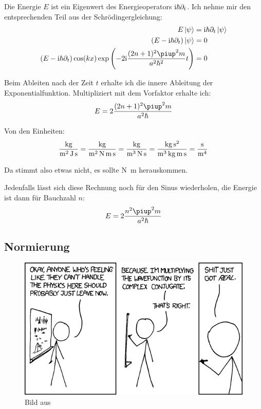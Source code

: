 Die Energie $E$ ist ein Eigenwert des Energieoperators $\mathrm i \hbar \partial_t$.
Ich nehme mir den entsprechenden Teil aus der Schrödingergleichung:
\begin{align*}
	E \ket\psi &= \iup \hbar \partial_t \ket\psi \\
	\del{E - \ii \hbar \partial_t} \ket\psi &= 0 \\
	\del{E - \ii \hbar \partial_t} \cos(kx) \exp\del{- 2 \ii \frac{(2n+1)^2\piup^2 m}{a^2\hbar^2} t} &= 0
\end{align*}

Beim Ableiten nach der Zeit $t$ erhalte ich die innere Ableitung der Exponentialfunktion. Multipliziert mit dem Vorfaktor erhalte ich:
\[
	E = 2 \frac{(2n+1)^2\piup^2 m}{a^2\hbar}
\]

Von den Einheiten:
\[
	\si[per-mode=fraction]{\kilo\gram\per\meter\squared\per\joule\per\second}
	= \si[per-mode=fraction]{\kilo\gram\per\meter\squared\per\newton\per\meter\per\second}
	= \si[per-mode=fraction]{\kilo\gram\per\meter\cubed\per\newton\per\second}
	= \si[per-mode=fraction]{\kilo\gram\second\squared\per\meter\cubed\per\kilo\gram\per\meter\per\second}
	= \si[per-mode=fraction]{\second\per\meter\tothe 4}
\]

Da stimmt also etwas nicht, es sollte \si{N.m} herauskommen.

Jedenfalls lässt sich diese Rechnung noch für den Sinus wiederholen, die Energie ist dann für Bauchzahl $n$:
\[
	E = 2 \frac{n^2\piup^2 m}{a^2\hbar}
\]

\subsection{Normierung}

\begin{figure}[h!]
	\centering
	\includegraphics[width=.5\textwidth]{complex_conjugate.png}
	\caption{Bild aus \cite{xkcd-complex_conjugate}}
	\label{fig:}
\end{figure}

